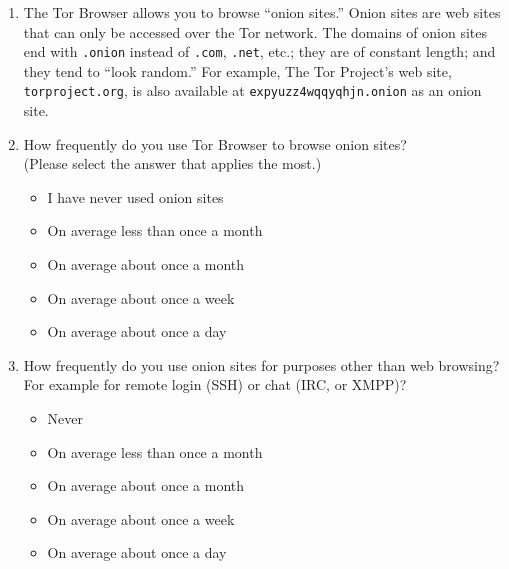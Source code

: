 \begin{enumerate}
    \item The Tor Browser allows you to browse ``onion sites.'' Onion sites are
        web sites that can only be accessed over the Tor network. The domains of
        onion sites end with \texttt{.onion} instead of \texttt{.com},
        \texttt{.net}, etc.; they are of constant length; and they tend to
        ``look random.'' For example, The Tor Project's web site,
        \texttt{torproject.org}, is also available at
        \texttt{expyuzz4wqqyqhjn.onion} as an onion site.

    \item How frequently do you use Tor Browser to browse onion sites?\\(Please
        select the answer that applies the most.)
        \begin{itemize}[label=$\Circle$]
            \item I have never used onion sites
            \item On average less than once a month
            \item On average about once a month
            \item On average about once a week
            \item On average about once a day
        \end{itemize}

    \item How frequently do you use onion sites for purposes other than web
        browsing? For example for remote login (SSH) or chat (IRC, or XMPP)?
        \begin{itemize}[label=$\Circle$]
            \item Never
            \item On average less than once a month
            \item On average about once a month
            \item On average about once a week
            \item On average about once a day
        \end{itemize}


\end{enumerate}
